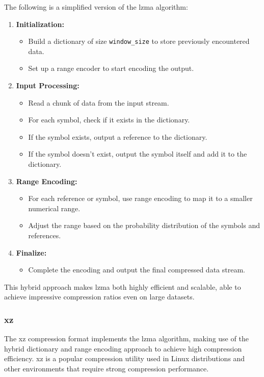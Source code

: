     The following is a simplified version of the \gls{lzma} algorithm:
    \begin{enumerate}[label=\textbf{\roman*.}]
        \item \textbf{Initialization:}
        \begin{itemize}
            \item Build a dictionary of size \texttt{window\_size} to store previously encountered data.
            \item Set up a range encoder to start encoding the output.
        \end{itemize}
        \item \textbf{Input Processing:}
        \begin{itemize}
            \item Read a chunk of data from the input stream.
            \item For each symbol, check if it exists in the dictionary.
            \item If the symbol exists, output a reference to the dictionary.
            \item If the symbol doesn't exist, output the symbol itself and add it to the dictionary.
        \end{itemize}
        \item \textbf{Range Encoding:}
        \begin{itemize}
            \item For each reference or symbol, use range encoding to map it to a smaller numerical range.
            \item Adjust the range based on the probability distribution of the symbols and references.
        \end{itemize}
        \item \textbf{Finalize:}
        \begin{itemize}
            \item Complete the encoding and output the final compressed data stream.
        \end{itemize}
    \end{enumerate}

    This hybrid approach makes \gls{lzma} both highly efficient and scalable, able to achieve impressive compression ratios even on large datasets.

    \subsubsection{xz}
    The xz compression format implements the \gls{lzma} algorithm, making use of the hybrid dictionary and range encoding approach to achieve high compression efficiency. xz is a popular compression utility used in Linux distributions and other environments that require strong compression performance.

